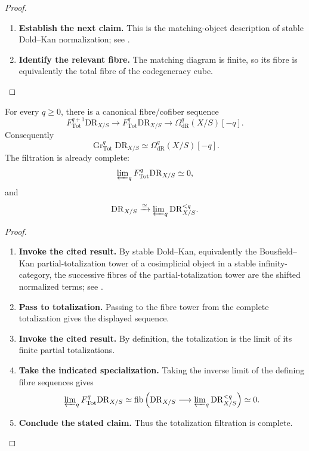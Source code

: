 \begin{proof}
\leavevmode
\begin{enumerate}[label=\textup{(\arabic*)}]
    \item \textbf{Establish the next claim.}
    This is the matching-object description of stable Dold--Kan normalization; see
    \cite{LurieHigherAlgebra}.
    \item \textbf{Identify the relevant fibre.}
    The matching diagram is finite, so its fibre is equivalently the
    total fibre of the codegeneracy cube.
\end{enumerate}
\end{proof}

\begin{theorem}
\label{thm:complete-filtration}
For every \(q\geq0\), there is a canonical fibre/cofiber sequence
\[
  F^{q+1}_{\mathrm{Tot}}\mathrm{DR}_{X/S}
  \longrightarrow
  F^q_{\mathrm{Tot}}\mathrm{DR}_{X/S}
  \longrightarrow
  \Omega^q_{\mathrm{dR}}(X/S)[-q].
\]
Consequently
\[
  \operatorname{Gr}^q_{\mathrm{Tot}}\mathrm{DR}_{X/S}
  \simeq
  \Omega^q_{\mathrm{dR}}(X/S)[-q].
\]
The filtration is already complete:
\[
  \varprojlim\nolimits_qF^q_{\mathrm{Tot}}\mathrm{DR}_{X/S}
  \simeq0,
\]
and
\[
  \mathrm{DR}_{X/S}
  \xrightarrow{\simeq}
  \varprojlim\nolimits_q\mathrm{DR}^{<q}_{X/S}.
\]
\end{theorem}

\begin{proof}
\leavevmode
\begin{enumerate}[label=\textup{(\arabic*)}]
    \item \textbf{Invoke the cited result.}
    By stable Dold--Kan, equivalently the Bousfield--Kan partial-totalization tower of
    a cosimplicial object in a stable infinity-category, the successive fibres of the
    partial-totalization tower are the shifted normalized terms; see
    \cite{LurieHigherAlgebra}.
    \item \textbf{Pass to totalization.}
    Passing to the fibre tower from the complete totalization gives
    the displayed sequence.
    \item \textbf{Invoke the cited result.}
    By definition, the totalization is the limit of its finite partial totalizations.
    \item \textbf{Take the indicated specialization.}
    Taking the inverse limit of the defining fibre sequences gives
    \[
    \varprojlim\nolimits_qF^q_{\mathrm{Tot}}\mathrm{DR}_{X/S}
    \simeq
    \operatorname{fib}
    \left(
    \mathrm{DR}_{X/S}
    \longrightarrow
    \varprojlim\nolimits_q\mathrm{DR}^{<q}_{X/S}
    \right)
    \simeq0.
    \]
    \item \textbf{Conclude the stated claim.}
    Thus the totalization filtration is complete.
\end{enumerate}
\end{proof}

